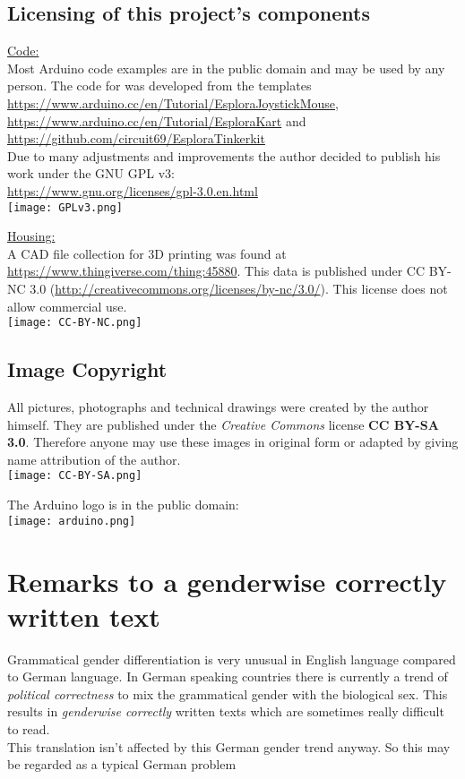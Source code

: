 \subsection*{Licensing of this project's components}
\uline{Code:}\\
Most Arduino code examples are in the public domain and may be used
by any person. The code for {\Bezeichnung} was developed from the
templates\\
\url{https://www.arduino.cc/en/Tutorial/EsploraJoystickMouse},\\
\url{https://www.arduino.cc/en/Tutorial/EsploraKart} and\\
\url{https://github.com/circuit69/EsploraTinkerkit}\\
Due to many adjustments and improvements the author decided to publish
his work under the GNU GPL v3:\\
\url{https://www.gnu.org/licenses/gpl-3.0.en.html}\\
\texttt{[image: GPLv3.png]}

\uline{Housing:}\\
A CAD file collection for 3D printing was found at
\url{https://www.thingiverse.com/thing:45880}. This data is published
under CC BY-NC 3.0
(\url{http://creativecommons.org/licenses/by-nc/3.0/}). 
This license does not allow commercial use.\\
\texttt{[image: CC-BY-NC.png]}


\subsection*{Image Copyright}
All pictures, photographs and technical drawings were created by the
author himself. They are published under the \textit{Creative Commons}
license \textbf{CC BY-SA 3.0}. Therefore anyone may use these images
in original form or adapted by giving name attribution of the author.\\
\texttt{[image: CC-BY-SA.png]}

The Arduino logo is in the public domain:\\
\texttt{[image: arduino.png]}


\newpage
\section{Remarks to a genderwise correctly written text}
Grammatical gender differentiation is very unusual in English language
compared to German language. In  German speaking countries there is
currently a trend of \textit{political correctness} to mix the
grammatical gender with the biological sex. This results in
\textit{genderwise correctly} written texts which are sometimes really
difficult to read.\\
This translation isn't affected by this German gender trend anyway. So
this may be regarded as a typical German problem 

